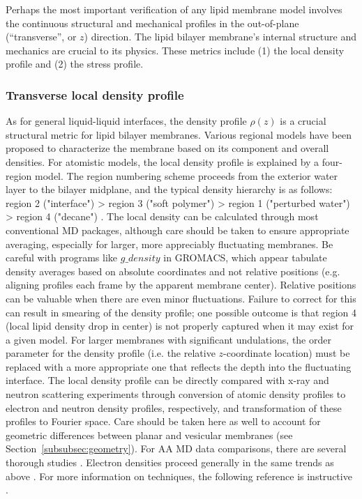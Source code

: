 \documentclass[9pt,bestpractices]{livecoms}
\begin{document}
Perhaps the most important verification of any lipid membrane model involves the continuous structural and mechanical profiles in the out-of-plane (``transverse'', or $z$) direction. The lipid bilayer membrane's internal structure and mechanics are crucial to its physics. These metrics include (1) the local density profile and (2) the stress profile.

\subsubsection{Transverse local density profile}
\label{subsubsec:locdens}
As for general liquid-liquid interfaces, the density profile $\rho(z)$ is a crucial structural metric for lipid bilayer membranes.
Various regional models have been proposed to characterize the membrane based on its component and overall densities.
For atomistic models, the local density profile is explained by a four-region model.
The region numbering scheme proceeds from the exterior water layer to the bilayer midplane, and the typical density hierarchy is as follows: region 2 ("interface") > region 3 ("soft polymer") > region 1 ("perturbed water") > region 4 ("decane") \cite{Tieleman1997b}.
The local density can be calculated through most conventional MD packages, although care should be taken to ensure appropriate averaging, especially for larger, more appreciably fluctuating membranes.
Be careful with programs like $g\_density$ in GROMACS, which appear tabulate density averages based on absolute coordinates and not relative positions (e.g. aligning profiles each frame by the apparent membrane center).
Relative positions can be valuable when there are even minor fluctuations.
Failure to correct for this can result in smearing of the density profile; one possible outcome is that region 4 (local lipid density drop in center) is not properly captured when it may exist for a given model.
For larger membranes with significant undulations, the order parameter for the density profile (i.e. the relative $z$-coordinate location) must be replaced with a more appropriate one that reflects the depth into the fluctuating interface.
The local density profile can be directly compared with x-ray and neutron scattering experiments through conversion of atomic density profiles to electron and neutron density profiles, respectively, and transformation of these profiles to Fourier space.
Care should be taken here as well to account for geometric differences between planar and vesicular membranes (see Section~\ref{subsubsec:geometry}).
For AA MD data comparisons, there are several thorough studies \cite{Braun2011,Klauda2006a}.
Electron densities proceed generally in the same trends as above \cite{Klauda2010d}.
For more information on techniques, the following reference is instructive \cite{Poger2016}.
\end{document}
